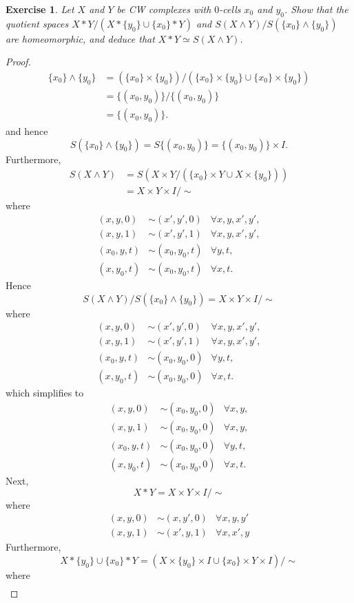 \documentclass{article}
\newtheorem{exercise}[theorem]{Exercise}
\begin{document}
\begin{exercise}
Let $X$ and $Y$ be CW complexes with $0$-cells $x_0$ and $y_0$. Show that the quotient spaces $X*Y/(X*\{y_0\}\cup\{x_0\}*Y)$ and $S(X\wedge Y)/S(\{x_0\}\wedge\{y_0\})$ are homeomorphic, and deduce that $X*Y\simeq S(X\wedge Y)$.
\end{exercise}
\begin{proof}
\begin{align*}\{x_0\}\wedge\{y_0\}&=(\{x_0\}\times\{y_0\})/(\{x_0\}\times\{y_0\}\cup\{x_0\}\times\{y_0\})\\&=\{(x_0,y_0)\}/\{(x_0,y_0)\}\\&=\{(x_0,y_0)\}.\end{align*}and hence\[S(\{x_0\}\wedge\{y_0\})=S\{(x_0,y_0)\}=\{(x_0,y_0)\}\times I.\]
Furthermore,
\begin{align*}
S(X\wedge Y)&=S(X\times Y/(\{x_0\}\times Y\cup X\times\{y_0\}))\\&=X\times Y\times I/\sim
\end{align*}where \begin{align*}(x,y,0)&\sim(x',y',0)&\forall x,y,x',y',\\ (x,y,1)&\sim(x',y',1)&\forall x,y,x',y',\\(x_0,y,t)&\sim(x_0,y_0,t)&\forall y,t,\\ (x,y_0,t)&\sim(x_0,y_0,t)&\forall x,t.\end{align*} Hence \[S(X\wedge Y)/S(\{x_0\}\wedge\{y_0\})=X\times Y\times I/\sim\]where\begin{align*}(x,y,0)&\sim(x',y',0)&\forall x,y,x',y',\\ (x,y,1)&\sim(x',y',1)&\forall x,y,x',y',\\(x_0,y,t)&\sim(x_0,y_0,0)&\forall y,t,\\ (x,y_0,t)&\sim(x_0,y_0,0)&\forall x,t.\end{align*} which simplifies to \begin{align*}(x,y,0)&\sim(x_0,y_0,0)&\forall x,y,\\ (x,y,1)&\sim(x_0,y_0,0)&\forall x,y,\\(x_0,y,t)&\sim(x_0,y_0,0)&\forall y,t,\\ (x,y_0,t)&\sim(x_0,y_0,0)&\forall x,t.\end{align*}Next,
\[X*Y=X\times Y\times I/\sim\] where \begin{align*}
(x,y,0)&\sim(x,y',0)&\forall x,y,y'\\(x,y,1)&\sim(x',y,1)&\forall x,x',y
\end{align*}Furthermore, \[X*\{y_0\}\cup \{x_0\}*Y=(X\times\{y_0\}\times I\cup \{x_0\}\times Y\times I)/\sim\]where\begin{align*}

\end{align*}
\end{proof}
\end{document}
